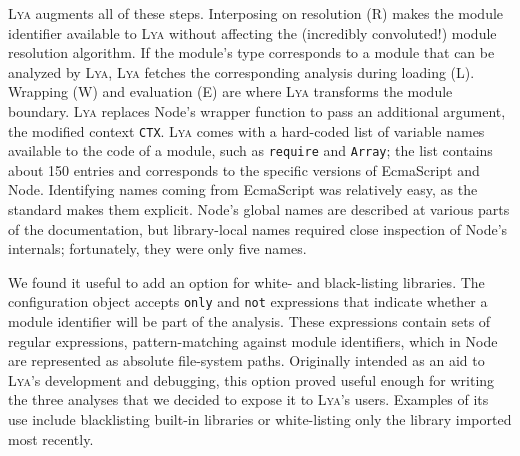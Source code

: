 \documentclass[letterpaper,twocolumn,10pt]{article}
\def\eg{{\em e.g.}, }
\def\etc{{\em etc.}\xspace}
\newcommand{\ttt}[1]{\texttt{#1}}
\newcommand{\sys}{{\scshape Lya}\xspace}
\begin{document}
\sys augments all of these steps.
Interposing on resolution (R) makes the module identifier available to \sys without affecting the (incredibly convoluted!) module resolution algorithm.
If the module's type corresponds to a module that can be analyzed by \sys, \sys fetches the corresponding analysis during loading (L).
Wrapping (W) and evaluation (E) are where \sys transforms the module boundary.
\sys replaces Node's wrapper function to pass an additional argument, the modified context \ttt{CTX}.
\sys comes with a hard-coded list of variable names available to the code of a module, such as \ttt{require} and \ttt{Array};
  the list contains about 150 entries and corresponds to the specific versions of EcmaScript and Node.
Identifying names coming from EcmaScript was relatively easy, as the standard makes them explicit.
Node's global names are described at various parts of the documentation, but library-local names required close inspection of Node's internals; fortunately, they were only five names.


We found it useful to add an option for white- and black-listing libraries.
The configuration object accepts \ttt{only} and \ttt{not} expressions that indicate whether a module identifier will be part of the analysis.
These expressions contain sets of regular expressions, pattern-matching against module identifiers, which in Node are represented as absolute file-system paths.
Originally intended as an aid to \sys's development and debugging, this option proved useful enough for writing the three analyses that we decided to expose it to \sys's users.
Examples of its use include blacklisting built-in libraries or white-listing only the library imported most recently.
\end{document}
